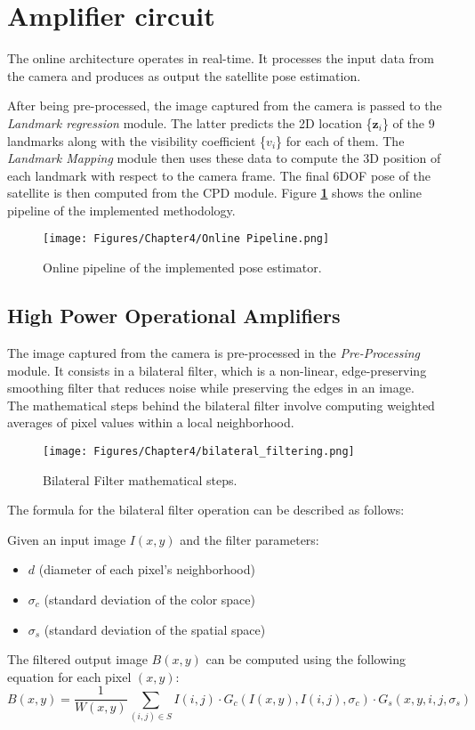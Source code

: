 \section{Amplifier circuit}
The online architecture operates in real-time. It processes the input data from the camera and produces as output the satellite pose estimation.

After being pre-processed, the image captured from the camera is passed to the \textit{Landmark regression} module. The latter predicts the 2D location \{\(\textbf{z}_i\)\} of the 9 landmarks along with the visibility coefficient \{\(v_i\)\} for each of them. The \textit{Landmark Mapping} module then uses these data to compute the 3D position of each landmark with respect to the camera frame. The final 6DOF pose of the satellite is then computed from the CPD module. Figure \textbf{\ref{fig:Online Pipeline}} shows the online pipeline of the implemented methodology.
\begin{figure}[H]
    \centering
    \texttt{[image: Figures/Chapter4/Online Pipeline.png]}
    \caption[Online pipeline of the implemented pose estimator.]{Online pipeline of the implemented pose estimator.}
    \label{fig:Online Pipeline}
\end{figure}

\subsection{High Power Operational Amplifiers}
\label{Chapter4/Pre-Processing}
The image captured from the camera is pre-processed in the \textit{Pre-Processing} module. It consists in a bilateral filter, which is a non-linear, edge-preserving smoothing filter that reduces noise while preserving the edges in an image.\\
The mathematical steps behind the bilateral filter involve computing weighted averages of pixel values within a local neighborhood. 
\begin{figure}[th]
    \centering
    \texttt{[image: Figures/Chapter4/bilateral\_filtering.png]}
    \caption[Bilateral Filter.]{Bilateral Filter mathematical steps.}
    \label{fig:Bilateral Filter}
\end{figure}

The formula for the bilateral filter operation can be described as follows:

Given an input image \(I(x, y)\) and the filter parameters:
\begin{itemize}
    \item \(d\) (diameter of each pixel's neighborhood)
    \item \(\sigma_c\) (standard deviation of the color space)
    \item \(\sigma_s\) (standard deviation of the spatial space)
\end{itemize}
The filtered output image \(B(x, y)\) can be computed using the following equation for each pixel \((x, y)\):
\begin{equation}
   B(x, y) = \frac{1}{W(x, y)} \sum_{(i, j) \in S} I(i, j) \cdot G_c(I(x, y), I(i, j), \sigma_c) \cdot G_s(x, y, i, j, \sigma_s) 
\end{equation}


